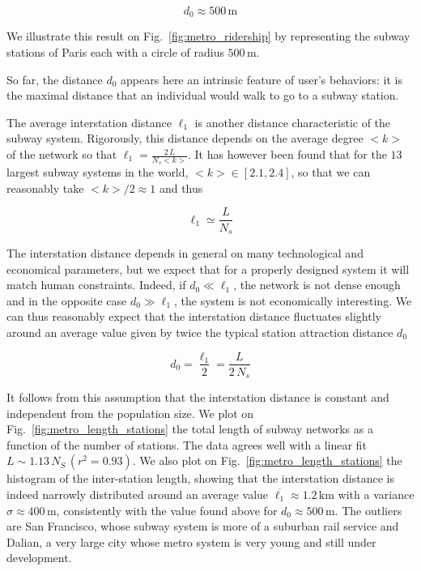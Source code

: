 \begin{equation}
    d_0 \approx 500\,\text{m}
\end{equation}

We illustrate this result on Fig.~\ref{fig:metro_ridership} by representing the
subway stations of Paris each with a circle of radius $500\,\text{m}$. 

So far, the distance $d_0$ appears here an intrinsic feature of user's
behaviors: it is the maximal distance that an individual would walk to go to a
subway station.

The average interstation distance $\ell_1$ is another distance characteristic of
the subway system. Rigorously, this distance depends on the average degree $<k>$
of the network so that $\ell_1 = \frac{2\,L}{N_s <k>}$. It has however been
found that for the $13$ largest subway systems in the world, $<k> \in
\left[2.1,2.4\right]$, so that we can reasonably take $<k> / 2 \approx 1$ and
thus

\begin{equation} \ell_1 \simeq \frac{L}{N_s} \end{equation}

The interstation distance depends in general on many technological and
economical parameters, but we expect that for a properly designed system it will
match human constraints. Indeed, if $d_0\ll\ell_1$, the network is not dense
enough and in the opposite case $d_0\gg\ell_1$, the system is not economically
interesting. We can thus reasonably expect that the interstation distance
fluctuates slightly around an average value given by twice the typical station
attraction distance $d_0$

\begin{equation} d_0 = \frac{\ell_1}{2} = \frac{L}{2\,N_s} \end{equation}

It follows from this assumption that the interstation distance is constant and
independent from  the population size. We plot on
Fig.~\ref{fig:metro_length_stations} the total length of subway networks as a
function of the number of stations. The data agrees well with a linear fit $L
\sim 1.13\,N_S\,(r^2=0.93)$. We also plot on
Fig.~\ref{fig:metro_length_stations} the histogram of the inter-station length,
showing that the interstation distance is indeed narrowly distributed around an
average value $\overline{\ell_1} \approx 1.2\,\text{km}$ with a variance $\sigma
\approx 400\,\text{m}$, consistently with the value found above for $d_0\approx
500\,\text{m}$. The outliers are San Francisco, whose subway system is more of a
suburban rail service and Dalian, a very large city whose metro system is very
young and still under development.

